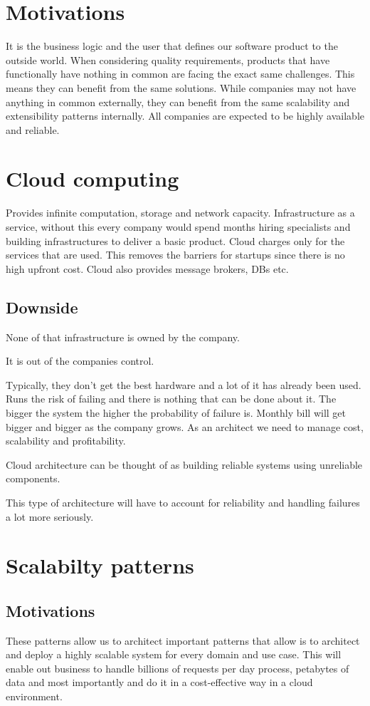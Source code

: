\section{Motivations}

It is the business logic and the user that defines our software product to the outside world.
When considering quality requirements, products that have functionally have nothing in common are facing the exact same challenges.
This means they can benefit from the same solutions.
While companies may not have anything in common externally, they can benefit from the same scalability and extensibility patterns internally.
All companies are expected to be highly available and reliable.

\section{Cloud computing}

Provides infinite computation, storage and network capacity.
Infrastructure as a service, without this every company would spend months hiring specialists and building infrastructures to deliver a basic product.
Cloud charges only for the services that are used.
This removes the barriers for startups since there is no high upfront cost.
Cloud also provides message brokers, DBs etc.

\subsection{Downside}

None of that infrastructure is owned by the company.

It is out of the companies control.

Typically, they don't get the best hardware and a lot of it has already been used.
Runs the risk of failing and there is nothing that can be done about it.
The bigger the system the higher the probability of failure is.
Monthly bill will get bigger and bigger as the company grows.
As an architect we need to manage cost, scalability and profitability.

Cloud architecture can be thought of as building reliable systems using unreliable components.

This type of architecture will have to account for reliability and handling failures a lot more seriously.

\section{Scalabilty patterns}

\subsection{Motivations}
These patterns allow us to architect important patterns that allow is to architect and deploy a highly scalable system for every domain and use case.
This will enable out business to handle billions of requests per day process, petabytes of data and most importantly and do it in a cost-effective way in a cloud environment.